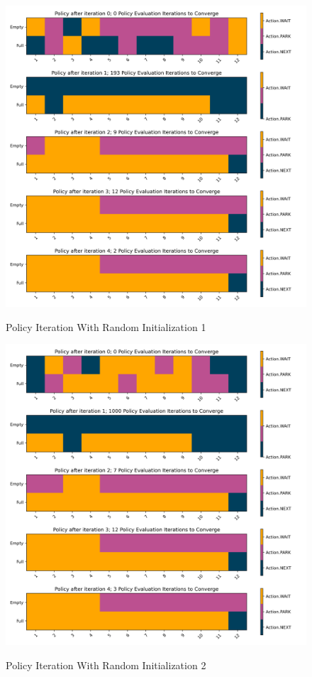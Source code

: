 \documentclass[12pt]{article}
\begin{document}
\begin{figure}
  \includegraphics[width=0.95\linewidth]{Figures/policy_iteration_policies_1.png}
  \centering
  \label{fig:policy-iteration-1}
  \caption{Policy Iteration With Random Initialization 1}
\end{figure}

\begin{figure}
  \includegraphics[width=0.95\linewidth]{Figures/policy_iteration_policies_2.png}
  \centering
  \label{fig:policy-iteration-2}
  \caption{Policy Iteration With Random Initialization 2}
\end{figure}
\end{document}
